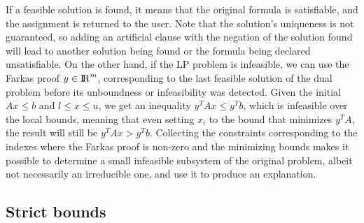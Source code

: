 \documentclass[runningheads]{llncs}
\begin{document}
If a feasible solution is found, it means that the original formula is satisfiable, and the assignment is returned to the user.
Note that the solution's uniqueness is not guaranteed, so adding an artificial clause with the negation of the solution found will lead to another solution being found or the formula being declared unsatisfiable.
On the other hand, if the LP problem is infeasible, we can use the Farkas proof $y \in {\rm I\!R}^m$, corresponding to the last feasible solution of the dual problem before its unboundness or infeasibility was detected.
Given the initial $Ax \le b$ and $l \le x \le u$, we get an inequality $y^T A x \le y^T b$, which is infeasible over the local bounds, meaning that even setting $x_i$ to the bound that minimizes $y^T A$, the result will still be $y^T A x > y^T b$.
Collecting the constraints corresponding to the indexes where the Farkas proof is non-zero and the minimizing bounds makes it possible to determine a small infeasible subsystem of the original problem, albeit not necessarily an irreducible one, and use it to produce an explanation.

\subsection{Strict bounds}
\label{sec:strict-bounds}
\end{document}
